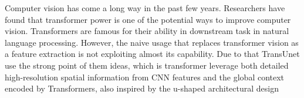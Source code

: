 Computer vision has come a long way in the past few years. Researchers have found that transformer power is one of the potential ways to improve computer vision. Transformers are famous for their ability in downstream task in natural language processing. However, the naive usage that replaces transformer vision as a feature extraction is not exploiting almost its capability. Due to that TransUnet\cite{TransUnet} use the strong point of them ideas, which is transformer leverage both detailed high-resolution spatial information from CNN features and the global context encoded by Transformers, also inspired by the u-shaped architectural design 
